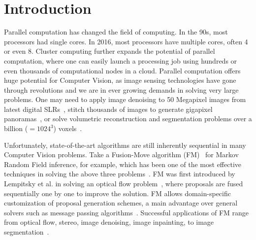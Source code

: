 \section{Introduction}
Parallel computation has changed the field of computing.  In the 90s,
most processors had single cores. In 2016, most processors have multiple
cores, often 4 or even 8. Cluster computing further expands the
potential of parallel computation, where one can easily launch a
processing job using hundreds or even thousands of computational nodes
in a cloud.
%
Parallel computation offers huge potential for Computer Vision, as
image sensing technologies have gone through revolutions and we are in
ever growing demands in solving very large problems. One may need to
apply image denoising to 50 Megapixel images from latest digital
SLRs~\cite{canon?}, stitch thousands of images to generate gigapixel
panoramas~\cite{gigapan}, or solve volumetric reconstruction and
segmentation problems over a billion ($=1024^3$)
voxels~\cite{Joint_3D_Scene_Reconstruction_and_class_Segmentation}.


Unfortunately, state-of-the-art algorithms are still inherently
sequential in many Computer Vision problems. Take a Fusion-Move
algorithm (FM)~\cite{viktor,second_order_stereo,else} for Markov Random
Field inference, for example, which has been one of the most effective
techniques in solving the above three
problems~\cite{fusion_moves_for_markov_random_field_optimization}.
%
FM was first introduced by Lempitsky et al. in solving an optical flow
problem~\cite{first_fusion_viktor}, where proposals are fused
sequentially one by one to improve the solution. FM allows
domain-specific customization of proposal generation schemes, a main
advantage over general solvers such as message passing
algorithms~\cite{TRW,loopy_belief_propagation}.  Successful applications
of FM range from optical flow, stereo, image denoising, image
inpainting, to image
segmentation~\cite{fusion_moves_for_markov_random_field_optimization}.


